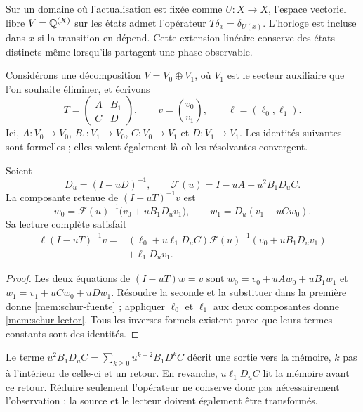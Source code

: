 Sur un domaine où l'actualisation est fixée comme \(U:X\to X\),
l'espace vectoriel libre \(V=\mathbb Q^{(X)}\) sur les états admet l'opérateur
\(T\delta_x=\delta_{U(x)}\). L'horloge est incluse dans \(x\) si la
transition en dépend. Cette extension linéaire conserve des états
distincts même lorsqu'ils partagent une phase observable.

Considérons une décomposition \(V=V_0\oplus V_1\), où \(V_1\)
est le secteur auxiliaire que l'on souhaite éliminer, et écrivons
\[
 T=\begin{pmatrix}A&B_1\\C&D\end{pmatrix},\qquad
 v=\binom{v_0}{v_1},\qquad \ell=(\ell_0,\ell_1).
\]
Ici, \(A:V_0\to V_0\), \(B_1:V_1\to V_0\),
\(C:V_0\to V_1\) et \(D:V_1\to V_1\).
Les identités suivantes sont formelles ; elles valent également là où les
résolvantes convergent.

\begin{proposition}
\label{mem:prop-schur}
Soient
\[
 D_u=(I-uD)^{-1},\qquad
 \mathscr F(u)=I-uA-u^2B_1D_uC.
\]
La composante retenue de \((I-uT)^{-1}v\) est
\begin{equation}
 w_0=\mathscr F(u)^{-1}\bigl(v_0+uB_1D_uv_1\bigr),
 \qquad w_1=D_u(v_1+uCw_0).
 \label{mem:schur-fuente}
\end{equation}
Sa lecture complète satisfait
\begin{equation}
 \begin{split}
 \ell(I-uT)^{-1}v
 ={}&(\ell_0+u\ell_1D_uC)
       \mathscr F(u)^{-1}(v_0+uB_1D_uv_1)\\
    &+\ell_1D_uv_1.
 \end{split}
 \label{mem:schur-lector}
\end{equation}
\end{proposition}
\begin{proof}
Les deux équations de \((I-uT)w=v\) sont
\(w_0=v_0+uAw_0+uB_1w_1\) et
\(w_1=v_1+uCw_0+uDw_1\).
Résoudre la seconde et la substituer dans la première donne
\eqref{mem:schur-fuente} ; appliquer \(\ell_0\) et \(\ell_1\)
aux deux composantes donne \eqref{mem:schur-lector}.
Tous les inverses formels existent parce que leurs termes constants
sont des identités.
\end{proof}

Le terme \(u^2B_1D_uC=\sum_{k\geq0}u^{k+2}B_1D^kC\)
décrit une sortie vers la mémoire, \(k\) pas à l'intérieur de celle-ci et
un retour. En revanche, \(u\ell_1D_uC\) lit la mémoire avant ce
retour. Réduire seulement l'opérateur ne conserve donc pas nécessairement
l'observation : la source et le lecteur doivent également être transformés.

